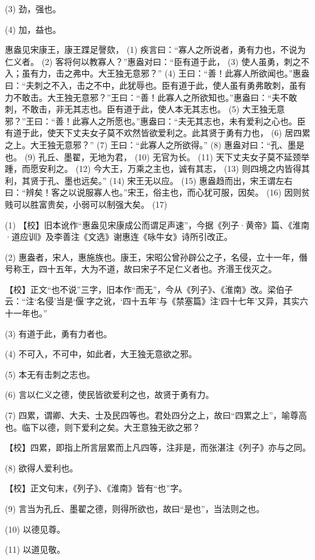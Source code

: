 \documentclass[12pt,UTF8]{ctexbook}
\begin{document}
(3) 劲，强也。

(4) 加，益也。

惠盎见宋康王，康王蹀足謦欬， (1) 疾言曰：“寡人之所说者，勇有力也，不说为仁义者。 (2) 客将何以教寡人？”惠盎对曰：“臣有道于此， (3) 使人虽勇，刺之不入；虽有力，击之弗中。大王独无意邪？” (4) 王曰：“善！此寡人所欲闻也。”惠盎曰：“夫刺之不入，击之不中，此犹辱也。臣有道于此，使人虽有勇弗敢刺，虽有力不敢击。大王独无意邪？”王曰：“善！此寡人之所欲知也。”惠盎曰：“夫不敢刺，不敢击，非无其志也。臣有道于此，使人本无其志也。 (5) 大王独无意邪？”王曰：“善！此寡人之所愿也。”惠盎曰：“夫无其志也，未有爱利之心也。臣有道于此，使天下丈夫女子莫不欢然皆欲爱利之。此其贤于勇有力也， (6) 居四累之上。大王独无意邪？” (7) 王曰：“此寡人之所欲得。” (8) 惠盎对曰：“孔、墨是也。 (9) 孔丘、墨翟，无地为君， (10) 无官为长。 (11) 天下丈夫女子莫不延颈举踵，而愿安利之。 (12) 今大王，万乘之主也，诚有其志， (13) 则四境之内皆得其利，其贤于孔、墨也远矣。” (14) 宋王无以应。 (15) 惠盎趋而出，宋王谓左右曰：“辨矣！客之以说服寡人也。”宋王，俗主也，而心犹可服，因矣。 (16) 因则贫贱可以胜富贵矣，小弱可以制强大矣。 (17)

(1) 【校】旧本讹作“惠盎见宋康成公而谓足声速”，今据《列子·黄帝》篇、《淮南·道应训》及李善注《文选》谢惠连《咏牛女》诗所引改正。

(2) 惠盎者，宋人，惠施族也。康王，宋昭公曾孙辟公之子，名侵，立十一年，僭号称王，四十五年，大为不道，故曰宋子不足仁义者也。齐湣王伐灭之。

【校】正文“也不说”三字，旧本作“而无”，今从《列子》、《淮南》改。梁伯子云：“注‘名侵’当是‘偃’字之讹，‘四十五年’与《禁塞篇》注‘四十七年’又异，其实六十一年也。”

(3) 有道于此，勇有力者也。

(4) 不可入，不可中，如此者，大王独无意欲之邪。

(5) 本无有击刺之志也。

(6) 言以仁义之德，使民皆欲爱利之也，故贤于勇有力。

(7) 四累，谓卿、大夫、士及民四等也。君处四分之上，故曰“四累之上”，喻尊高也。临下以德，则下爱利之矣。大王意独无欲之邪？

【校】四累，即指上所言层累而上凡四等，注非是，而张湛注《列子》亦与之同。

(8) 欲得人爱利也。

【校】正文句末，《列子》、《淮南》皆有“也”字。

(9) 言当为孔丘、墨翟之德，则得所欲也，故曰“是也”，当法则之也。

(10) 以德见尊。

(11) 以道见敬。
\end{document}
